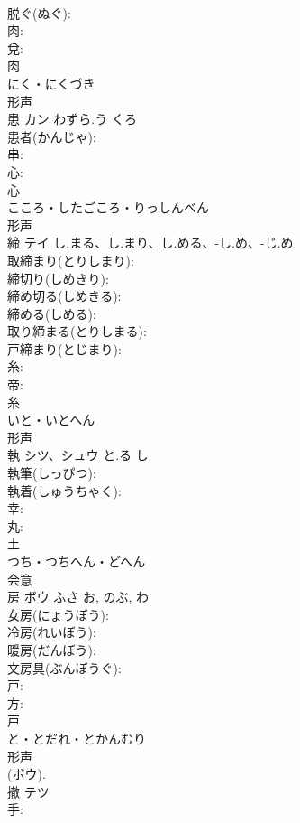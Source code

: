 \documentclass[8pt]{extreport}
\begin{document}
\begin{CJK}{UTF8}{min}
\\	脱ぐ(ぬぐ): 
\\	肉: 
\\	兌: 
\\	肉	
\\	にく・にくづき	
\\	形声 
\\	患	カン	わずら.う	くろ	
\\	患者(かんじゃ): 
\\	串: 
\\	心: 
\\	心	
\\	こころ・したごころ・りっしんべん	
\\	形声 
\\	締	テイ	し.まる、し.まり、し.める、-し.め、-じ.め		
\\	取締まり(とりしまり): 
\\	締切り(しめきり): 
\\	締め切る(しめきる): 
\\	締める(しめる): 
\\	取り締まる(とりしまる): 
\\	戸締まり(とじまり): 
\\	糸: 
\\	帝: 
\\	糸	
\\	いと・いとへん	
\\	形声 
\\	執	シツ、シュウ	と.る	し	
\\	執筆(しっぴつ): 
\\	執着(しゅうちゃく): 
\\	幸: 
\\	丸: 
\\	土	
\\	つち・つちへん・どへん	
\\	会意 
\\	房	ボウ	ふさ	お, のぶ, わ	
\\	女房(にょうぼう): 
\\	冷房(れいぼう): 
\\	暖房(だんぼう): 
\\	文房具(ぶんぼうぐ): 
\\	戸: 
\\	方: 
\\	戸	
\\	と・とだれ・とかんむり	
\\	形声 
\\	(ボウ).
\\	撤	テツ			
\\	手: 

\end{CJK}
\end{document}
